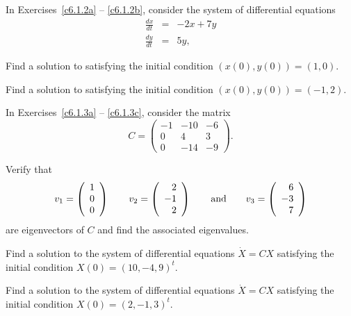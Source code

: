 \noindent In Exercises~\ref{c6.1.2a} -- \ref{c6.1.2b}, consider the system of
differential equations
\begin{equation}  \label{E:c6.1.2}
\begin{array}{rcl}
\frac{dx}{dt} & = & -2x+7y \\
\frac{dy}{dt} & = &  5y,
\end{array}
\end{equation}
\begin{exercise} \label{c6.1.2a}
Find a solution to 
satisfying the initial condition $(x(0),y(0)) = (1,0)$.
\end{exercise}
\begin{exercise} \label{c6.1.2b}
Find a solution to 
satisfying the initial condition $(x(0),y(0)) = (-1,2)$.
\end{exercise}

\noindent In Exercises~\ref{c6.1.3a} -- \ref{c6.1.3c}, consider the matrix
\[
C = \left(\begin{array}{rrr} -1 & -10 & -6\\  0 & 4  & 3 \\  0  & -14  & -9
	\end{array}\right).
\]
\begin{exercise} \label{c6.1.3a}
Verify that
\[
v_1 = \left(\begin{array}{r} 1 \\ 0\\ 0\end{array}\right) \qquad
v_2 = \left(\begin{array}{r} 2 \\ -1\\ 2\end{array}\right) \quad \quad\mbox{and}\quad \quad
v_3 = \left(\begin{array}{r} 6 \\ -3\\ 7\end{array}\right)
\]
are eigenvectors of $C$ and find the associated eigenvalues.
\end{exercise}
\begin{exercise} \label{c6.1.3b}
Find a solution to the system of differential equations
$\dot{X}=CX$ satisfying the initial condition $X(0)= (10, -4, 9)^t$.
\end{exercise}
\begin{exercise} \label{c6.1.3c}
Find a solution to the system of differential equations
$\dot{X}=CX$ satisfying the initial condition $X(0)= ( 2, -1, 3)^t$.
\end{exercise}

